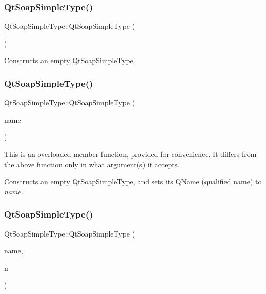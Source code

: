 \subsubsection{\texorpdfstring{Qt\+Soap\+Simple\+Type()}{QtSoapSimpleType()}\hspace{0.1cm}{\footnotesize\ttfamily [1/6]}}
{\footnotesize\ttfamily Qt\+Soap\+Simple\+Type\+::\+Qt\+Soap\+Simple\+Type (\begin{DoxyParamCaption}{ }\end{DoxyParamCaption})}

Constructs an empty \mbox{\hyperlink{class_qt_soap_simple_type}{Qt\+Soap\+Simple\+Type}}. \mbox{\label{class_qt_soap_simple_type_adff3b31f44bd9520a4d7a9b61f9831ac}} 
\subsubsection{\texorpdfstring{Qt\+Soap\+Simple\+Type()}{QtSoapSimpleType()}\hspace{0.1cm}{\footnotesize\ttfamily [2/6]}}
{\footnotesize\ttfamily Qt\+Soap\+Simple\+Type\+::\+Qt\+Soap\+Simple\+Type (\begin{DoxyParamCaption}\item[{const \mbox{\hyperlink{class_qt_soap_q_name}{Qt\+Soap\+Q\+Name}} \&}]{name }\end{DoxyParamCaption})}

This is an overloaded member function, provided for convenience. It differs from the above function only in what argument(s) it accepts.

Constructs an empty \mbox{\hyperlink{class_qt_soap_simple_type}{Qt\+Soap\+Simple\+Type}}, and sets its Q\+Name (qualified name) to {\itshape name}. \mbox{\label{class_qt_soap_simple_type_a68d489b4ad93f0895589953343066853}} 
\subsubsection{\texorpdfstring{Qt\+Soap\+Simple\+Type()}{QtSoapSimpleType()}\hspace{0.1cm}{\footnotesize\ttfamily [3/6]}}
{\footnotesize\ttfamily Qt\+Soap\+Simple\+Type\+::\+Qt\+Soap\+Simple\+Type (\begin{DoxyParamCaption}\item[{const \mbox{\hyperlink{class_qt_soap_q_name}{Qt\+Soap\+Q\+Name}} \&}]{name,  }\item[{int}]{n }\end{DoxyParamCaption})}

